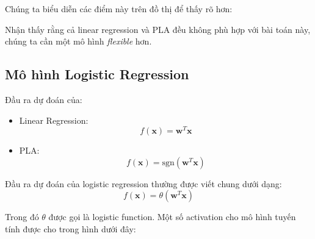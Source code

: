 Chúng ta biểu diễn các điểm này trên đồ thị để thấy rõ hơn: 
 
 
Nhận thấy rằng cả linear regression và PLA đều không phù hợp với bài toán này, chúng ta cần một mô hình \textit{flexible} hơn. 
 
 
\subsection{Mô hình Logistic Regression}
Đầu ra dự đoán của: 
\begin{itemize}
    \item Linear Regression:  
        \begin{equation*} 
        f(\mathbf{x}) = \mathbf{w}^T \mathbf{x} 
        \end{equation*} 
    
     \item PLA: 
    \begin{equation*} 
    f(\mathbf{x}) = \text{sgn}(\mathbf{w}^T\mathbf{x}) 
    \end{equation*} 
\end{itemize} 
 
Đầu ra dự đoán của logistic regression thường được viết chung dưới dạng: 
\begin{equation*} 
f(\mathbf{x}) = \theta(\mathbf{w}^T\mathbf{x}) 
\end{equation*} 
 
Trong đó $\theta$ được gọi là logistic function. Một số activation cho mô hình tuyến tính được cho trong hình dưới đây: 
 


